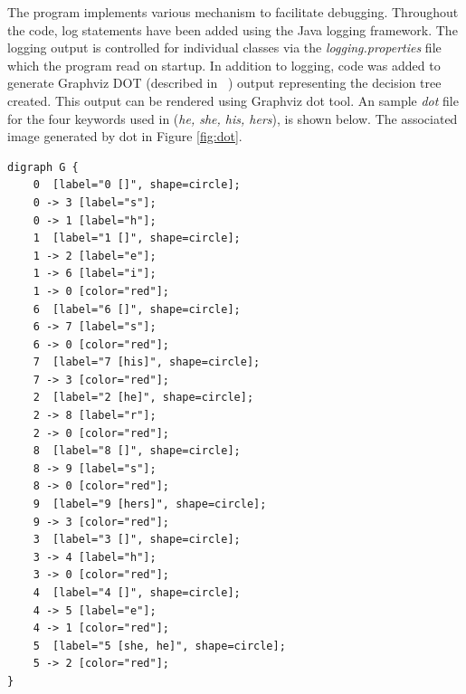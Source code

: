 \documentclass[10pt]{report}
\begin{document}
The program implements various mechanism to facilitate
debugging. Throughout the code, log statements have been added using
the Java logging framework. The logging output is controlled for
individual classes via the \textit{logging.properties} file which the
program read on startup. In addition to logging, code was added to
generate Graphviz DOT (described in ~\cite{RefWorks:110}) output
representing the decision tree created. This output can be rendered
using Graphviz dot tool. An sample \textit{dot} file for the four
keywords used in \cite{RefWorks:103} (\textit{he, she, his, hers}), is
shown below. The associated image generated by dot in Figure
\ref{fig:dot}.


\begin{verbatim}
digraph G {
	0  [label="0 []", shape=circle];
	0 -> 3 [label="s"];
	0 -> 1 [label="h"];
	1  [label="1 []", shape=circle];
	1 -> 2 [label="e"];
	1 -> 6 [label="i"];
	1 -> 0 [color="red"];
	6  [label="6 []", shape=circle];
	6 -> 7 [label="s"];
	6 -> 0 [color="red"];
	7  [label="7 [his]", shape=circle];
	7 -> 3 [color="red"];
	2  [label="2 [he]", shape=circle];
	2 -> 8 [label="r"];
	2 -> 0 [color="red"];
	8  [label="8 []", shape=circle];
	8 -> 9 [label="s"];
	8 -> 0 [color="red"];
	9  [label="9 [hers]", shape=circle];
	9 -> 3 [color="red"];
	3  [label="3 []", shape=circle];
	3 -> 4 [label="h"];
	3 -> 0 [color="red"];
	4  [label="4 []", shape=circle];
	4 -> 5 [label="e"];
	4 -> 1 [color="red"];
	5  [label="5 [she, he]", shape=circle];
	5 -> 2 [color="red"];
}
\end{verbatim}
\end{document}
